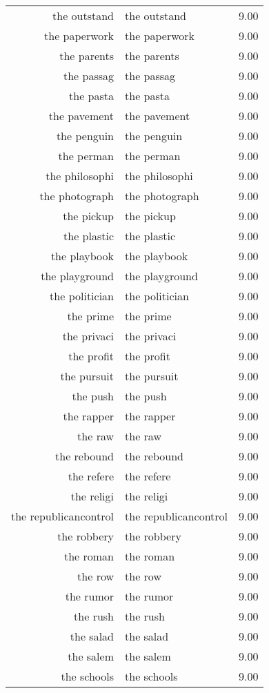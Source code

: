 \begin{table}[ht]
\begin{tabular}{rlr}
  the outstand & the outstand & 9.00 \\ 
  the paperwork & the paperwork & 9.00 \\ 
  the parents & the parents & 9.00 \\ 
  the passag & the passag & 9.00 \\ 
  the pasta & the pasta & 9.00 \\ 
  the pavement & the pavement & 9.00 \\ 
  the penguin & the penguin & 9.00 \\ 
  the perman & the perman & 9.00 \\ 
  the philosophi & the philosophi & 9.00 \\ 
  the photograph & the photograph & 9.00 \\ 
  the pickup & the pickup & 9.00 \\ 
  the plastic & the plastic & 9.00 \\ 
  the playbook & the playbook & 9.00 \\ 
  the playground & the playground & 9.00 \\ 
  the politician & the politician & 9.00 \\ 
  the prime & the prime & 9.00 \\ 
  the privaci & the privaci & 9.00 \\ 
  the profit & the profit & 9.00 \\ 
  the pursuit & the pursuit & 9.00 \\ 
  the push & the push & 9.00 \\ 
  the rapper & the rapper & 9.00 \\ 
  the raw & the raw & 9.00 \\ 
  the rebound & the rebound & 9.00 \\ 
  the refere & the refere & 9.00 \\ 
  the religi & the religi & 9.00 \\ 
  the republicancontrol & the republicancontrol & 9.00 \\ 
  the robbery & the robbery & 9.00 \\ 
  the roman & the roman & 9.00 \\ 
  the row & the row & 9.00 \\ 
  the rumor & the rumor & 9.00 \\ 
  the rush & the rush & 9.00 \\ 
  the salad & the salad & 9.00 \\ 
  the salem & the salem & 9.00 \\ 
  the schools & the schools & 9.00 \\ 

\end{tabular}
\end{table}
